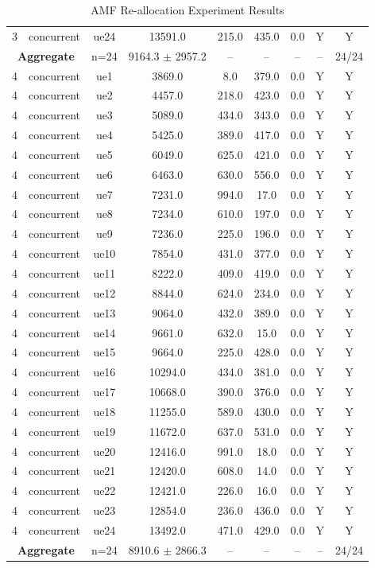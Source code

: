 \begin{table}[ht]
\begin{tabular}{|c|c|c|c|c|c|c|c|c|}
3 & concurrent & ue24 & 13591.0 & 215.0 & 435.0 & 0.0 & Y & Y \\
\multicolumn{2}{|c|}{\textbf{Aggregate}} & n=24 & 9164.3 $\pm$ 2957.2 & -- & -- & -- & -- & 24/24 \\
\hline
4 & concurrent & ue1 & 3869.0 & 8.0 & 379.0 & 0.0 & Y & Y \\
4 & concurrent & ue2 & 4457.0 & 218.0 & 423.0 & 0.0 & Y & Y \\
4 & concurrent & ue3 & 5089.0 & 434.0 & 343.0 & 0.0 & Y & Y \\
4 & concurrent & ue4 & 5425.0 & 389.0 & 417.0 & 0.0 & Y & Y \\
4 & concurrent & ue5 & 6049.0 & 625.0 & 421.0 & 0.0 & Y & Y \\
4 & concurrent & ue6 & 6463.0 & 630.0 & 556.0 & 0.0 & Y & Y \\
4 & concurrent & ue7 & 7231.0 & 994.0 & 17.0 & 0.0 & Y & Y \\
4 & concurrent & ue8 & 7234.0 & 610.0 & 197.0 & 0.0 & Y & Y \\
4 & concurrent & ue9 & 7236.0 & 225.0 & 196.0 & 0.0 & Y & Y \\
4 & concurrent & ue10 & 7854.0 & 431.0 & 377.0 & 0.0 & Y & Y \\
4 & concurrent & ue11 & 8222.0 & 409.0 & 419.0 & 0.0 & Y & Y \\
4 & concurrent & ue12 & 8844.0 & 624.0 & 234.0 & 0.0 & Y & Y \\
4 & concurrent & ue13 & 9064.0 & 432.0 & 389.0 & 0.0 & Y & Y \\
4 & concurrent & ue14 & 9661.0 & 632.0 & 15.0 & 0.0 & Y & Y \\
4 & concurrent & ue15 & 9664.0 & 225.0 & 428.0 & 0.0 & Y & Y \\
4 & concurrent & ue16 & 10294.0 & 434.0 & 381.0 & 0.0 & Y & Y \\
4 & concurrent & ue17 & 10668.0 & 390.0 & 376.0 & 0.0 & Y & Y \\
4 & concurrent & ue18 & 11255.0 & 589.0 & 430.0 & 0.0 & Y & Y \\
4 & concurrent & ue19 & 11672.0 & 637.0 & 531.0 & 0.0 & Y & Y \\
4 & concurrent & ue20 & 12416.0 & 991.0 & 18.0 & 0.0 & Y & Y \\
4 & concurrent & ue21 & 12420.0 & 608.0 & 14.0 & 0.0 & Y & Y \\
4 & concurrent & ue22 & 12421.0 & 226.0 & 16.0 & 0.0 & Y & Y \\
4 & concurrent & ue23 & 12854.0 & 236.0 & 436.0 & 0.0 & Y & Y \\
4 & concurrent & ue24 & 13492.0 & 471.0 & 429.0 & 0.0 & Y & Y \\
\multicolumn{2}{|c|}{\textbf{Aggregate}} & n=24 & 8910.6 $\pm$ 2866.3 & -- & -- & -- & -- & 24/24 \\
\hline
\end{tabular}
\caption{AMF Re-allocation Experiment Results}
\label{tab:amf_realloc}
\end{table}
